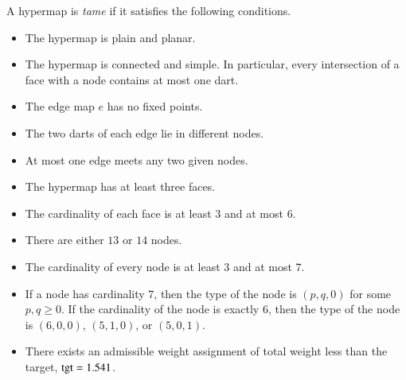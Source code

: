 A hypermap is {\it tame\/} if it satisfies the following conditions.
%

\begin{itemize}
    \label{definition:tame}
    \item {}  The hypermap is plain and planar.
    \item {} The hypermap is connected and simple.  In particular, every intersection of a face with a node contains at most one dart.
    \item {} The edge map $e$ has no fixed points.
    \item {} The two darts of each edge lie in different nodes.
    \item {} At most one edge meets any two given nodes.
%
  \item {} The hypermap has at least three faces.
    \item {} The cardinality of each face is at least $3$ and at most $6$.
    \item {} There are either $13$ or $14$ nodes.
    \item {} The cardinality of every node is at least $3$ and at most
    $7$.
    \item {} If a node has cardinality $7$, then the type of the
       node is $(p,q,0)$ for some $p,q\ge0$.   If the
        cardinality of the node is exactly $6$, then the type of the node
        is $(6,0,0)$, $(5,1,0)$, or $(5,0,1)$.
    \item {} There exists an admissible weight assignment
        of total weight less than the target, ${\operatorname{tgt}}=1.541$.
\end{itemize}
%
%
%
%
%
%
%
%


